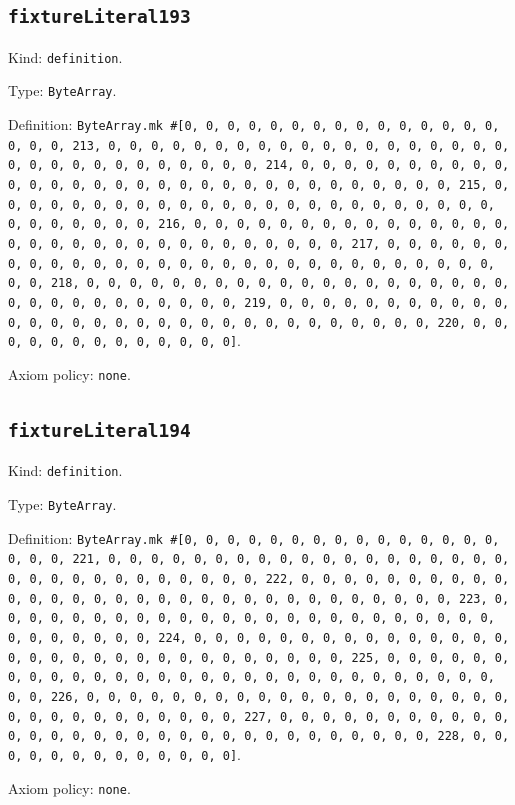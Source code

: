 \documentclass[11pt]{article}
\begin{document}
\subsection*{\texttt{fixtureLiteral193}}
\noindent Kind: \texttt{definition}.\par
\noindent Type: \texttt{ByteArray}.\par
\noindent Definition: \texttt{ByteArray.mk \#[0, 0, 0, 0, 0, 0, 0, 0, 0, 0, 0, 0, 0, 0, 0, 0, 0, 0, 213, 0, 0, 0, 0, 0, 0, 0, 0, 0, 0, 0, 0, 0, 0, 0, 0, 0, 0, 0, 0, 0, 0, 0, 0, 0, 0, 0, 0, 0, 0, 0, 214, 0, 0, 0, 0, 0, 0, 0, 0, 0, 0, 0, 0, 0, 0, 0, 0, 0, 0, 0, 0, 0, 0, 0, 0, 0, 0, 0, 0, 0, 0, 0, 215, 0, 0, 0, 0, 0, 0, 0, 0, 0, 0, 0, 0, 0, 0, 0, 0, 0, 0, 0, 0, 0, 0, 0, 0, 0, 0, 0, 0, 0, 0, 0, 216, 0, 0, 0, 0, 0, 0, 0, 0, 0, 0, 0, 0, 0, 0, 0, 0, 0, 0, 0, 0, 0, 0, 0, 0, 0, 0, 0, 0, 0, 0, 0, 217, 0, 0, 0, 0, 0, 0, 0, 0, 0, 0, 0, 0, 0, 0, 0, 0, 0, 0, 0, 0, 0, 0, 0, 0, 0, 0, 0, 0, 0, 0, 0, 218, 0, 0, 0, 0, 0, 0, 0, 0, 0, 0, 0, 0, 0, 0, 0, 0, 0, 0, 0, 0, 0, 0, 0, 0, 0, 0, 0, 0, 0, 0, 0, 219, 0, 0, 0, 0, 0, 0, 0, 0, 0, 0, 0, 0, 0, 0, 0, 0, 0, 0, 0, 0, 0, 0, 0, 0, 0, 0, 0, 0, 0, 0, 0, 220, 0, 0, 0, 0, 0, 0, 0, 0, 0, 0, 0, 0, 0]}.\par
\noindent Axiom policy: \texttt{none}.\par
\subsection*{\texttt{fixtureLiteral194}}
\noindent Kind: \texttt{definition}.\par
\noindent Type: \texttt{ByteArray}.\par
\noindent Definition: \texttt{ByteArray.mk \#[0, 0, 0, 0, 0, 0, 0, 0, 0, 0, 0, 0, 0, 0, 0, 0, 0, 0, 221, 0, 0, 0, 0, 0, 0, 0, 0, 0, 0, 0, 0, 0, 0, 0, 0, 0, 0, 0, 0, 0, 0, 0, 0, 0, 0, 0, 0, 0, 0, 0, 222, 0, 0, 0, 0, 0, 0, 0, 0, 0, 0, 0, 0, 0, 0, 0, 0, 0, 0, 0, 0, 0, 0, 0, 0, 0, 0, 0, 0, 0, 0, 0, 223, 0, 0, 0, 0, 0, 0, 0, 0, 0, 0, 0, 0, 0, 0, 0, 0, 0, 0, 0, 0, 0, 0, 0, 0, 0, 0, 0, 0, 0, 0, 0, 224, 0, 0, 0, 0, 0, 0, 0, 0, 0, 0, 0, 0, 0, 0, 0, 0, 0, 0, 0, 0, 0, 0, 0, 0, 0, 0, 0, 0, 0, 0, 0, 225, 0, 0, 0, 0, 0, 0, 0, 0, 0, 0, 0, 0, 0, 0, 0, 0, 0, 0, 0, 0, 0, 0, 0, 0, 0, 0, 0, 0, 0, 0, 0, 226, 0, 0, 0, 0, 0, 0, 0, 0, 0, 0, 0, 0, 0, 0, 0, 0, 0, 0, 0, 0, 0, 0, 0, 0, 0, 0, 0, 0, 0, 0, 0, 227, 0, 0, 0, 0, 0, 0, 0, 0, 0, 0, 0, 0, 0, 0, 0, 0, 0, 0, 0, 0, 0, 0, 0, 0, 0, 0, 0, 0, 0, 0, 0, 228, 0, 0, 0, 0, 0, 0, 0, 0, 0, 0, 0, 0, 0]}.\par
\noindent Axiom policy: \texttt{none}.\par
\end{document}

